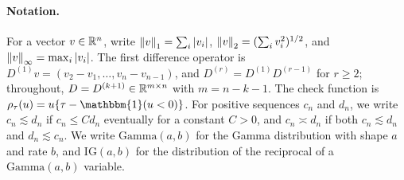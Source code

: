 \paragraph{Notation.} For a vector $v \in \mathbb{R}^n$, write $\left\lVert v\right\rVert_1 = \sum_i |v_i|$, $\left\lVert v\right\rVert_2 = (\sum_i v_i^2)^{1/2}$, and $\left\lVert v\right\rVert_\infty = \max_i |v_i|$. The first difference operator is $D^{(1)}v = (v_2 - v_1, \ldots, v_n - v_{n-1})$, and $D^{(r)} = D^{(1)}D^{(r-1)}$ for $r \geq 2$; throughout, $D = D^{(k+1)} \in \mathbb{R}^{m \times n}$ with $m = n - k - 1$. The check function is $\rho_\tau(u) = u\{\tau - \mathbbm{1}(u < 0)\}$. For positive sequences $c_n$ and $d_n$, we write $c_n \lesssim d_n$ if $c_n \leq C d_n$ eventually for a constant $C > 0$, and $c_n \asymp d_n$ if both $c_n \lesssim d_n$ and $d_n \lesssim c_n$. We write $\mathrm{Gamma}(a, b)$ for the Gamma distribution with shape $a$ and rate $b$, and $\mathrm{IG}(a, b)$ for the distribution of the reciprocal of a $\mathrm{Gamma}(a, b)$ variable.

